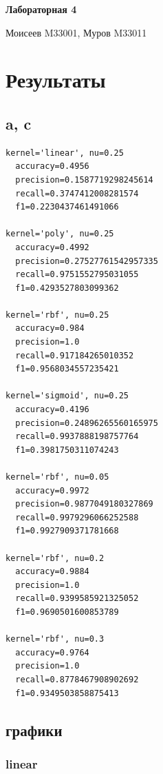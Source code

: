 \documentclass[11pt]{article}
\author{megabluejay}
\date{}
\title{}
\begin{document}
\begin{center}
\textbf{Лабораторная 4}

Моисеев M33001, Муров M33011
\end{center}

\section*{Результаты}
\label{sec:org8fd4dfd}

\subsection*{a, c}
\label{sec:org3001743}

\begin{verbatim}
kernel='linear', nu=0.25
  accuracy=0.4956
  precision=0.1587719298245614
  recall=0.3747412008281574
  f1=0.2230437461491066

kernel='poly', nu=0.25
  accuracy=0.4992
  precision=0.27527761542957335
  recall=0.9751552795031055
  f1=0.4293527803099362

kernel='rbf', nu=0.25
  accuracy=0.984
  precision=1.0
  recall=0.917184265010352
  f1=0.9568034557235421

kernel='sigmoid', nu=0.25
  accuracy=0.4196
  precision=0.24896265560165975
  recall=0.9937888198757764
  f1=0.3981750311074243

kernel='rbf', nu=0.05
  accuracy=0.9972
  precision=0.9877049180327869
  recall=0.9979296066252588
  f1=0.9927909371781668

kernel='rbf', nu=0.2
  accuracy=0.9884
  precision=1.0
  recall=0.9399585921325052
  f1=0.9690501600853789

kernel='rbf', nu=0.3
  accuracy=0.9764
  precision=1.0
  recall=0.8778467908902692
  f1=0.9349503858875413
\end{verbatim}

\subsection*{графики}
\label{sec:org40b2fdb}

\subsubsection*{linear}
\label{sec:org2158bf1}
\end{document}
